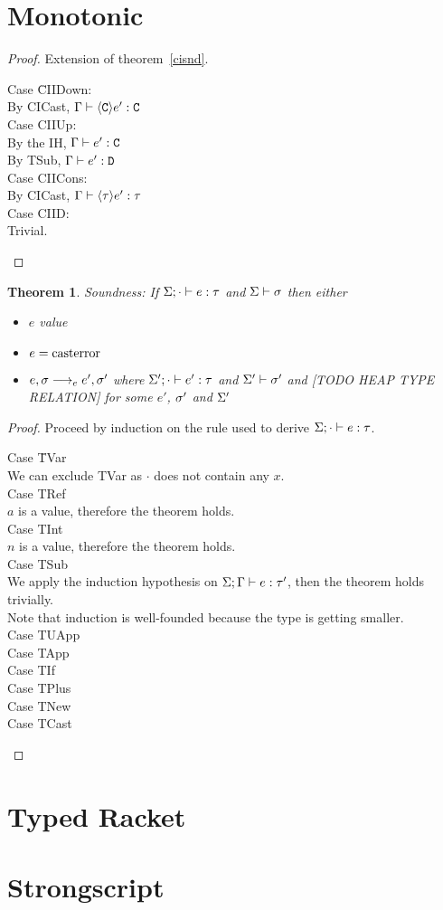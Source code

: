 \documentclass{report}
\newtheorem{thm}{Theorem}
\begin{document}
\section{Monotonic}

\begin{proof}

Extension of theorem~\ref{cisnd}.
\begin{tabbing}
Case \=CIIDown:\\
\> By CICast, $\Gdash \cast{\C}e' : \C$\\
Case CIIUp:\\
\> By the IH, $\Gdash e' : \C$\\
\> By TSub, $\Gdash e' : \xt{D}$\\
Case CIICons:\\
\> By CICast, $\Gdash \cast{\t}e' : \t$\\
Case CIID:\\
\> Trivial.\\
\end{tabbing}
\end{proof}

\begin{thm} Soundness: If $\S;\cdot \vdash e : \t$ and $\S \vdash \s$ then either
\begin{itemize}
\item $e$ value
\item $e = \casterror$
\item $e,\s \ereduce e',\s'$ where $\S';\cdot \vdash e' : \t$ and $\S' \vdash \s'$ and [TODO HEAP TYPE RELATION] for some $e'$, $\s'$ and $\S'$
\end{itemize}
\end{thm}

\begin{proof}
Proceed by induction on the rule used to derive $\S;\cdot \vdash e : \t$.
\begin{tabbing}
Case \=TVar\\
\> We can exclude TVar as $\cdot$ does not contain any $x$.\\
Case TRef\\
\> $a$ is a value, therefore the theorem holds. \\
Case TInt\\
\> $n$ is a value, therefore the theorem holds. \\
Case TSub\\
\> We apply the induction hypothesis on $\GSdash e : \t'$, then the theorem holds trivially.\\
\> Note that induction is well-founded because the type is getting smaller. \\
Case TUApp\\
\> 
Case TApp\\
Case TIf\\
Case TPlus\\
Case TNew\\
Case TCast\\
\end{tabbing}
\end{proof}
\section{Typed Racket}
\section{Strongscript}
\end{document}
